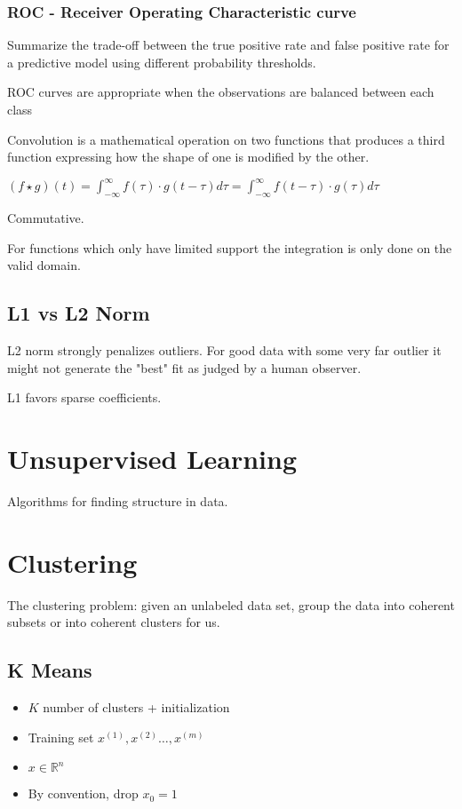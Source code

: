 \subsubsection{ROC -  Receiver Operating Characteristic curve}

Summarize the trade-off between the true positive rate and false positive rate for a predictive model using different probability thresholds.

ROC curves are appropriate when the observations are balanced between each class

Convolution is a mathematical operation on two functions that produces a third function expressing how the shape of one is modified by the other.

$(f\star g)(t) = \int_{-\infty}^{\infty} f(\tau)\cdot g(t-\tau)d\tau = \int_{-\infty}^{\infty} f(t-\tau)\cdot g(\tau)d\tau $

Commutative. 

For functions which only have limited support the integration is only done on the valid domain.

\subsection{L1 vs L2 Norm}

L2 norm strongly penalizes outliers. For good data with some very far outlier it might not generate the "best" fit as judged by a human observer.

L1 favors sparse coefficients.


\section{Unsupervised Learning}

Algorithms for finding structure in data.

\section{Clustering}

The clustering problem: given an unlabeled data set, group the data into coherent  subsets or into coherent clusters for us.

\subsection{K Means}

\begin{itemize}
\item $K$ number of clusters + initialization
\item Training set ${x^{(1)},x^{(2)}\dots,x^{(m)}}$
\item $x\in\mathbb{R}^n$
\item By convention, drop $x_0=1$
\end{itemize}

